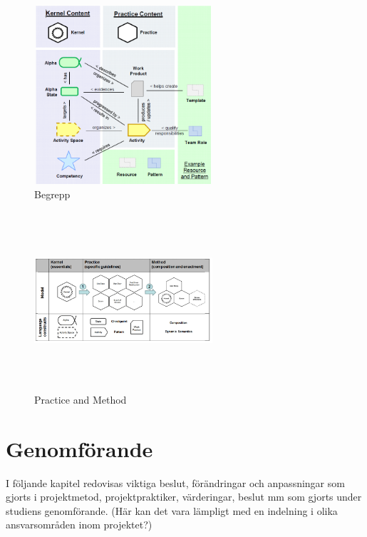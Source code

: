 \documentclass[conference]{IEEEtran}
\begin{document}
\begin{figure}[htbp]
    \centerline{\includegraphics[max height=250px, max width=250px]{images/begrepp.png}}
    \caption{Begrepp}
    \label{fig}
\end{figure}

\begin{figure}[htbp]
    \centerline{\includegraphics[max height=250px, max width=250px]{images/practicemethod.png}}
    \caption{Practice and Method}
    \label{fig}
\end{figure}

\section{Genomförande}
I följande kapitel redovisas viktiga beslut, förändringar och anpassningar som gjorts 
i projektmetod, projektpraktiker, värderingar, beslut mm som gjorts under studiens genomförande.
(Här kan det vara lämpligt med en indelning i olika ansvarsområden inom projektet?)
\end{document}
